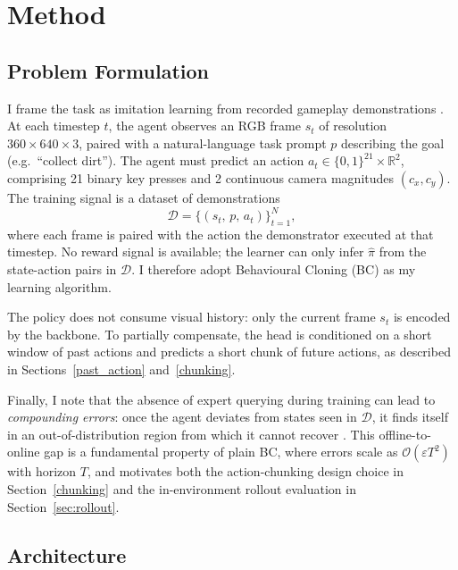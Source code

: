 \chapter{Method}
\label{chap:method}
\section{Problem Formulation}

I frame the task as imitation learning from recorded gameplay demonstrations
\cite{Bain1995AFF}. At each timestep $t$, the agent observes an RGB frame
$s_t$ of resolution $360 \times 640 \times 3$, paired with a natural-language
task prompt $p$ describing the goal (e.g.\ \enquote{collect dirt}). The agent
must predict an action $a_t \in \{0,1\}^{21} \times \mathbb{R}^2$, comprising
21 binary key presses and 2 continuous camera magnitudes $(c_x, c_y)$. The
training signal is a dataset of demonstrations
\begin{equation}
    \mathcal{D} = \{(s_t,\, p,\, a_t)\}_{t=1}^{N},
\end{equation}
where each frame is paired with the action the demonstrator executed at that
timestep. No reward signal is available; the learner can only infer
$\hat{\pi}$ from the state-action pairs in $\mathcal{D}$. I therefore adopt
Behavioural Cloning (BC) as my learning algorithm.

The policy does not consume visual history: only the current frame $s_t$ is
encoded by the backbone. To partially compensate, the head is conditioned on
a short window of past actions and predicts a short chunk of future actions,
as described in Sections~\ref{past_action} and~\ref{chunking}.

Finally, I note that the absence of expert querying during training can lead
to \textit{compounding errors}: once the agent deviates from states seen in
$\mathcal{D}$, it finds itself in an out-of-distribution region from which it
cannot recover \cite{ross2011}. This offline-to-online gap is a fundamental
property of plain BC, where errors scale as $\mathcal{O}(\varepsilon T^2)$
with horizon $T$, and motivates both the action-chunking design choice in
Section~\ref{chunking} and the in-environment rollout evaluation in
Section~\ref{sec:rollout}.

\section{Architecture} \label{sec:architecture}

